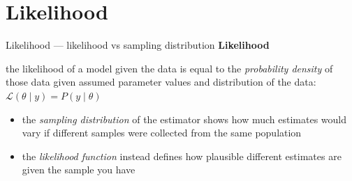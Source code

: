 \documentclass[
  ignorenonframetext,
  aspectratio=169,
  t]{beamer}
\newcommand{\blueit}[1]{\textcolor{bluebeamer}{\emph{#1}}}
\newcommand{\bluebold}[1]{\textcolor{bluebeamer}{\textbf{#1}}}
\begin{document}
\section{Likelihood}\label{likelihood}

\begin{frame}{Likelihood --- likelihood vs sampling distribution}
\protect{}\label{likelihood-likelihood-vs-sampling-distribution}
\bluebold{Likelihood}

the likelihood of a model given the data is equal to the
\blueit{probability density} of those data given assumed parameter
values and distribution of the data:
\(\mathcal{L}(\theta \mid y) = P(y \mid \theta)\)

\vspace{0.5cm}

\begin{callout}
\begin{itemize}
\item the \blueit{sampling distribution} of the estimator shows how much estimates would vary if different samples were collected from the same population
\item the \blueit{likelihood function} instead defines how plausible different estimates are given the sample you have
\end{itemize}
\end{callout}
\end{frame}
\end{document}

